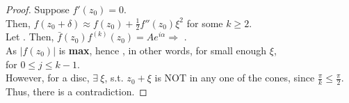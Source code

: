 \documentclass[12pt,a4paper]{article}
\begin{document}
\begin{proof}
  Suppose $f'(z_0) = 0$. \\
  
  \noindent Then, $f(z_0 + \delta) \approx f(z_0) + \frac{1}{2} f''(z_0) \xi^2$  for some $k \geq 2$. \\

  \noindent Let . Then, $\bar{f}(z_0) f^{(k)}(z_0) = Ae^{i\alpha} \Rightarrow$ . \\

  \noindent As $|f(z_0)|$ is \textbf{max}, hence , in other words, for small enough $\xi$, \\ 
  
  \noindent{} for $0 \leq j \leq k - 1$. \\

  \noindent However, for a disc, $\exists\ \xi$, s.t. $z_0 + \xi$ is NOT in any one of the cones, since $\frac{\pi}{k} \leq \frac{\pi}{2}$. Thus, there is a contradiction.
\end{proof}

\end{document}
